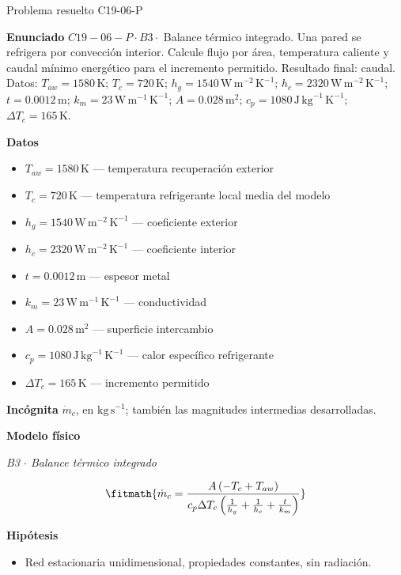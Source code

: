 \documentclass[10pt,openany]{book}
\begin{document}
\begin{studiumworked}{Problema resuelto C19-06-P}


\noindent\textbf{Enunciado}
\(C19-06-P \cdot B3 \cdot\) Balance térmico integrado. Una pared se refrigera por convección interior. Calcule flujo por área, temperatura caliente y caudal mínimo energético para el incremento permitido. Resultado final: caudal. Datos: \(T_{aw}=1580\, \mathrm{K}\); \(T_c=720\, \mathrm{K}\); \(h_g=1540\, \mathrm{W}\,\mathrm{m}^{-2}\,\mathrm{K}^{-1}\); \(h_c=2320\, \mathrm{W}\,\mathrm{m}^{-2}\,\mathrm{K}^{-1}\); \(t=0.0012\, \mathrm{m}\); \(k_m=23\, \mathrm{W}\,\mathrm{m}^{-1}\,\mathrm{K}^{-1}\); \(A=0.028\, \mathrm{m}^{2}\); \(c_p=1080\, \mathrm{J}\,\mathrm{kg}^{-1}\,\mathrm{K}^{-1}\); \(\Delta T_c=165\, \mathrm{K}\).

\noindent\textbf{Datos}
\begin{itemize}
\item $T_{aw} = 1580\,\mathrm{K}$ — temperatura recuperación exterior
\item $T_c = 720\,\mathrm{K}$ — temperatura refrigerante local media del modelo
\item $h_g = 1540\,\mathrm{W}\,\mathrm{m}^{-2}\,\mathrm{K}^{-1}$ — coeficiente exterior
\item $h_c = 2320\,\mathrm{W}\,\mathrm{m}^{-2}\,\mathrm{K}^{-1}$ — coeficiente interior
\item $t = 0.0012\,\mathrm{m}$ — espesor metal
\item $k_m = 23\,\mathrm{W}\,\mathrm{m}^{-1}\,\mathrm{K}^{-1}$ — conductividad
\item $A = 0.028\,\mathrm{m}^{2}$ — superficie intercambio
\item $c_p = 1080\,\mathrm{J}\,\mathrm{kg}^{-1}\,\mathrm{K}^{-1}$ — calor específico refrigerante
\item $\Delta T_c = 165\,\mathrm{K}$ — incremento permitido
\end{itemize}

\noindent\textbf{Incógnita}
$\dot{m}_c$, en $\mathrm{kg\,s^{-1}}$; también las magnitudes intermedias desarrolladas.

\noindent\textbf{Modelo físico}

\noindent\textit{B3 \(\cdot\) Balance térmico integrado}

\[
\fitmath{\dot{m}_c=\frac{A \left(- T_c + T_{aw}\right)}{c_p \Delta T_c \left(\frac{1}{h_g} + \frac{1}{h_c} + \frac{t}{k_m}\right)}}
\]

\noindent\textbf{Hipótesis}
\begin{itemize}
\item Red estacionaria unidimensional, propiedades constantes, sin radiación.
\end{itemize}


\end{studiumworked}
\end{document}
